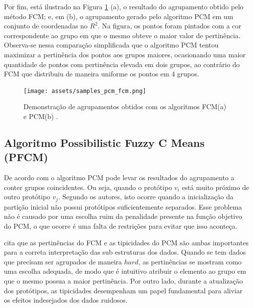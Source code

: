 Por fim, está ilustrado na Figura \ref{fig:samples_pcm_fcm} (a), o resultado do agrupamento
obtido pelo método FCM; e, em (b), o agrupamento gerado pelo algoritmo PCM em um conjunto de 
coordenadas no $R^2$. Na figura, os pontos foram pintados com a cor correspondente ao grupo em que o 
mesmo obteve o maior valor de pertinência. Observa-se nessa comparação simplificada que o algoritmo 
PCM tentou maximizar a pertinência dos pontos aos grupos maiores, ocasionando uma maior quantidade
de pontos com pertinência elevada em dois grupos, ao contrário do FCM que distribuiu de maneira
uniforme os pontos em 4 grupos.

\begin{figure}[!htp] 
  \centering 
  \texttt{[image: assets/samples\_pcm\_fcm.png]}
  \caption{Demonstração de agrupamentos obtidos com os algoritmos 
    FCM\protect\footnotemark (a) e PCM\protect\footnotemark[\value{footnote}](b)
  .} 
  \label{fig:samples_pcm_fcm} 
\end{figure}

\subsection{Algoritmo Possibilistic Fuzzy C Means (PFCM)} 

De acordo com  o algoritmo PCM pode levar os resultados do agrupamento 
a conter grupos coincidentes. Ou seja, quando o protótipo $v_i$ está muito próximo de outro protótipo
$v_j$. Segundo os autores, isto ocorre quando a inicialização da partição inicial não possui 
protótipos
suficientemente separados. Esse problema não é causado por uma escolha ruim da penalidade presente
na função objetivo do PCM, o que ocorre é uma falta de restrições para evitar que isso aconteça.

 cita que as pertinências do FCM e as tipicidades do PCM são ambas
importantes para a correta interpretação das sub estruturas dos dados. Quando se tem dados que
precisam ser agrupados de maneira $hard$, as pertinências se mostram como uma escolha adequada, de
modo que é intuitivo atribuir o elemento ao grupo em que o mesmo possua a maior pertinência. Por
outro lado, durante a atualização dos protótipos, as tipicidades desempenham um papel fundamental
para aliviar os efeitos indesejados dos dados ruidosos.

